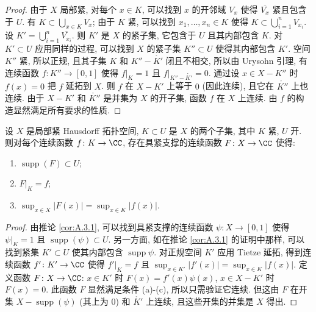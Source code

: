 \begin{proof}
由于 $X$ 局部紧, 对每个 $x \in K$, 可以找到 $x$ 的开邻域 $V_x$ 使得 $\overline{V_x}$ 紧且包含于 $U$. 有 $K \subset \bigcup_{x \in K}V_x$; 由于 $K$ 紧, 可以找到 $x_1, \ldots, x_n \in K$ 使得 $K \subset \bigcup_{i=1}^n V_{x_i}$. 设 $K' = \bigcup_{i=1}^n \overline{V_{x_i}}$. 则 $K'$ 是 $X$ 的紧子集, 它包含于 $U$ 且其内部包含 $K$. 对 $K' \subset U$ 应用同样的过程, 可以找到 $X$ 的紧子集 $K'' \subset U$ 使得其内部包含 $K'$.
空间 $K''$ 紧, 所以正规, 且其子集 $K$ 和 $K'' - \mathring{K'}$ 闭且不相交, 所以由 Urysohn 引理, 有连续函数 $f \colon K'' \to [0, 1]$ 使得 $f|_K = 1$ 且 $f|_{K'' - \mathring{K'}} = 0$. 通过设 $x \in X - K''$ 时 $f(x) = 0$ 把 $f$ 延拓到 $X$. 则 $f$ 在 $X - K'$ 上等于 $0$ (因此连续), 且它在 $\mathring{K''}$ 上也连续. 由于 $X - K'$ 和 $\mathring{K''}$ 是并集为 $X$ 的开子集, 函数 $f$ 在 $X$ 上连续. 由 $f$ 的构造显然满足所有要求的性质.
\end{proof}

\begin{corollary}[紧集上的函数延拓]
\label{cor:A.3.2}
设 $X$ 是局部紧 Hausdorff 拓扑空间, $K \subset U$ 是 $X$ 的两个子集, 其中 $K$ 紧, $U$ 开. 则对每个连续函数 $f \colon K \to \CC$, 存在具紧支撑的连续函数 $F \colon X \to \CC$ 使得:
\begin{enumerate}
\item[(a)] $\operatorname{supp}(F) \subset U$;
\item[(b)] $F|_K = f$;
\item[(c)] $\sup_{x \in X}|F(x)| = \sup_{x \in K}|f(x)|$.
\end{enumerate}
\end{corollary}

\begin{proof}
由推论 \ref{cor:A.3.1}, 可以找到具紧支撑的连续函数 $\psi \colon X \to [0, 1]$ 使得 $\psi|_K = 1$ 且 $\operatorname{supp}(\psi) \subset U$. 另一方面, 如在推论 \ref{cor:A.3.1} 的证明中那样, 可以找到紧集 $K' \subset U$ 使其内部包含 $\operatorname{supp}\psi$. 对正规空间 $K'$ 应用 Tietze 延拓, 得到连续函数 $f' \colon K' \to \CC$ 使得 $f'|_K = f$ 且 $\sup_{x \in K'}|f'(x)| = \sup_{x \in K}|f(x)|$. 定义函数 $F \colon X \to \CC$: $x \in K'$ 时 $F(x) = f'(x)\psi(x)$, $x \in X - K'$ 时 $F(x) = 0$. 此函数 $F$ 显然满足条件 (a)-(c), 所以只需验证它连续. 但这由 $F$ 在开集 $X - \operatorname{supp}(\psi)$ (其上为 $0$) 和 $\mathring{K'}$ 上连续, 且这些开集的并集是 $X$ 得出.
\end{proof}
